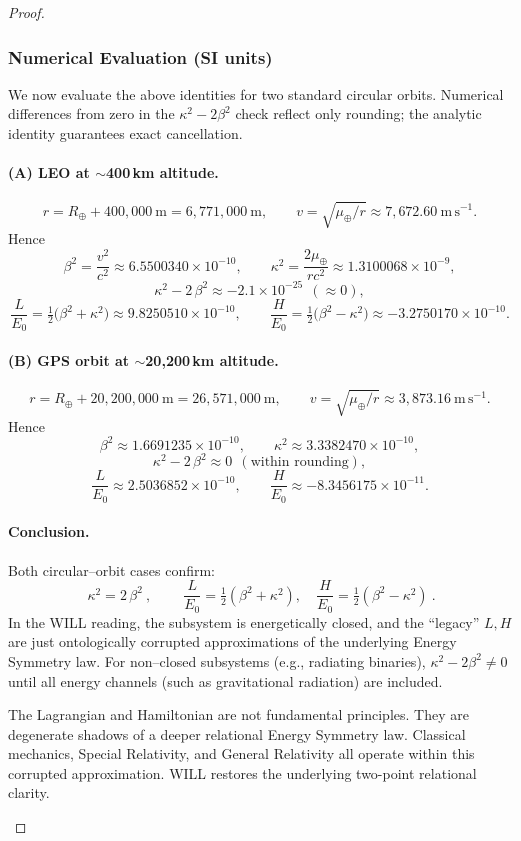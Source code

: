 \documentclass[12pt, a4paper]{article}
\begin{document}
\begin{proof}
\subsubsection*{Numerical Evaluation (SI units)}
We now evaluate the above identities for two standard circular orbits. Numerical differences from zero in the \(\kappa^2-2\beta^2\) check reflect only rounding; the analytic identity guarantees exact cancellation.

\paragraph{(A) LEO at \(\sim\)400\,km altitude.}
\[
r = R_\oplus + 400{,}000\ \mathrm{m}
= 6{,}771{,}000\ \mathrm{m},
\qquad
v = \sqrt{\mu_\oplus/r} \approx 7{,}672.60\ \mathrm{m\,s^{-1}}.
\]
Hence
\[
\beta^2 = \frac{v^2}{c^2} \approx 6.5500340\times10^{-10},
\qquad
\kappa^2 = \frac{2\mu_\oplus}{r c^2} \approx 1.3100068\times10^{-9},
\]
\[
\kappa^2 - 2\,\beta^2 \approx -2.1\times10^{-25}\ \ (\approx 0),
\]
\[
\frac{L}{E_0} = \tfrac{1}{2}\bigl(\beta^2+\kappa^2\bigr) \approx 9.8250510\times10^{-10},
\qquad
\frac{H}{E_0} = \tfrac{1}{2}\bigl(\beta^2-\kappa^2\bigr) \approx -3.2750170\times10^{-10}.
\]

\paragraph{(B) GPS orbit at \(\sim\)20{,}200\,km altitude.}
\[
r = R_\oplus + 20{,}200{,}000\ \mathrm{m}
= 26{,}571{,}000\ \mathrm{m},
\qquad
v = \sqrt{\mu_\oplus/r} \approx 3{,}873.16\ \mathrm{m\,s^{-1}}.
\]
Hence
\[
\beta^2 \approx 1.6691235\times10^{-10},
\qquad
\kappa^2 \approx 3.3382470\times10^{-10},
\]
\[
\kappa^2 - 2\,\beta^2 \approx 0\ \ (\text{within rounding}),
\]
\[
\frac{L}{E_0} \approx 2.5036852\times10^{-10},
\qquad
\frac{H}{E_0} \approx -8.3456175\times10^{-11}.
\]

\paragraph{Conclusion.}
Both circular–orbit cases confirm:
\[
\boxed{\ \kappa^2 = 2\,\beta^2\ },
\qquad
\boxed{\ \frac{L}{E_0} = \tfrac{1}{2}(\beta^2+\kappa^2),\quad
\frac{H}{E_0} = \tfrac{1}{2}(\beta^2-\kappa^2)\ }.
\]
In the WILL reading, the subsystem is energetically closed, and the ``legacy'' \(L,H\) are just ontologically corrupted approximations of the underlying Energy Symmetry law. For non–closed subsystems (e.g., radiating binaries), \(\kappa^2-2\beta^2\neq 0\) until all energy channels (such as gravitational radiation) are included.

\begin{tcolorbox}[colback=gray!5, colframe=black!80!black, title=Key Message]
The Lagrangian and Hamiltonian are not fundamental principles. They are 
degenerate shadows of a deeper relational Energy Symmetry law. Classical mechanics, 
Special Relativity, and General Relativity all operate within this corrupted 
approximation. WILL restores the underlying two-point relational clarity.
\end{tcolorbox}
\end{proof}
\end{document}
